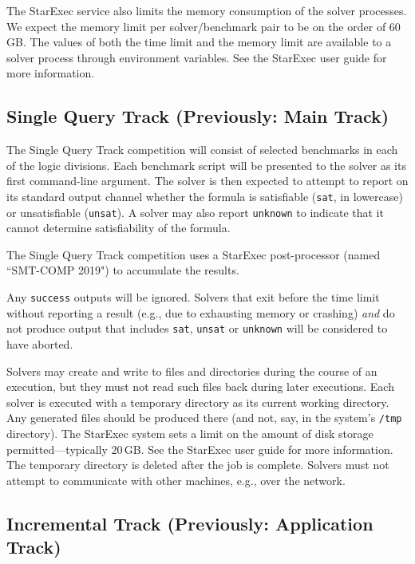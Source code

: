 \documentclass[12pt]{article}
\newcommand{\main}{Single Query\xspace}
\begin{document}
The StarExec service also limits the memory consumption of the solver
processes.  We expect the memory limit per solver/benchmark pair to be
on the order of 60\,GB.  The values of both the time limit and the
memory limit are available to a solver process through environment
variables.  See the StarExec user guide for more information.


\subsection{\main Track (Previously: Main Track)}
\label{sec:exec:single}

The \main Track competition will consist of selected benchmarks in each
of the logic divisions.  Each benchmark script will be presented to
the solver as its first command-line argument.  The solver is then
expected to attempt to report on its standard output channel whether
the formula is satisfiable (\texttt{sat}, in lowercase) or
unsatisfiable (\texttt{unsat}).  A solver may also report
\texttt{unknown} to indicate that it cannot determine satisfiability
of the formula.

The \main Track competition uses a StarExec post-processor (named
``SMT-COMP 2019") to accumulate the results.

%
Any \texttt{success} outputs will be ignored.  Solvers that exit
before the time limit without reporting a result (e.g., due to
exhausting memory or crashing) \emph{and} do not produce output that
includes \texttt{sat}, \texttt{unsat} or \texttt{unknown} will be
considered to have aborted.

%
Solvers may create and write to files and directories during the
course of an execution, but they must not read such files back during
later executions.  Each solver is executed with a temporary directory
as its current working directory.  Any generated files should be
produced there (and not, say, in the system's \texttt{/tmp}
directory).  The StarExec system sets a limit on the amount of disk
storage permitted---typically 20\,GB.  See the StarExec user guide for
more information.  The temporary directory is deleted after the job is
complete.  Solvers must not attempt to communicate with other
machines, e.g., over the network.

\subsection{Incremental Track (Previously: Application Track)}
\end{document}

